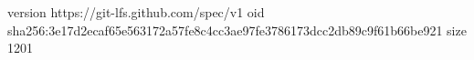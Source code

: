 version https://git-lfs.github.com/spec/v1
oid sha256:3e17d2ecaf65e563172a57fe8c4cc3ae97fe3786173dcc2db89c9f61b66be921
size 1201
